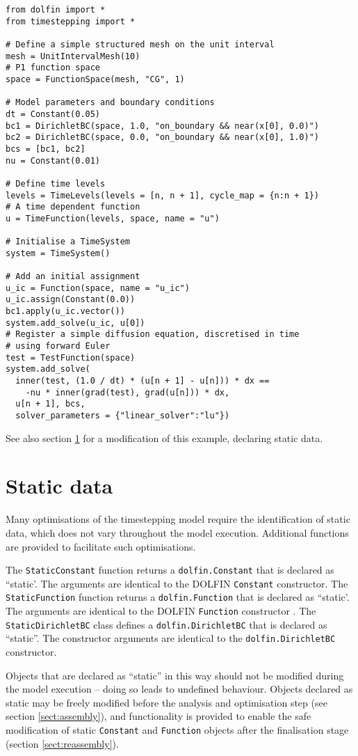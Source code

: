 \documentclass[a4paper]{book}
\begin{document}
\begin{lstlisting}
from dolfin import *
from timestepping import *

# Define a simple structured mesh on the unit interval
mesh = UnitIntervalMesh(10)
# P1 function space
space = FunctionSpace(mesh, "CG", 1)

# Model parameters and boundary conditions
dt = Constant(0.05)
bc1 = DirichletBC(space, 1.0, "on_boundary && near(x[0], 0.0)")
bc2 = DirichletBC(space, 0.0, "on_boundary && near(x[0], 1.0)")
bcs = [bc1, bc2]
nu = Constant(0.01)

# Define time levels
levels = TimeLevels(levels = [n, n + 1], cycle_map = {n:n + 1})
# A time dependent function
u = TimeFunction(levels, space, name = "u")

# Initialise a TimeSystem
system = TimeSystem()

# Add an initial assignment
u_ic = Function(space, name = "u_ic")
u_ic.assign(Constant(0.0))
bc1.apply(u_ic.vector())
system.add_solve(u_ic, u[0])
# Register a simple diffusion equation, discretised in time
# using forward Euler
test = TestFunction(space)
system.add_solve(
  inner(test, (1.0 / dt) * (u[n + 1] - u[n])) * dx ==
    -nu * inner(grad(test), grad(u[n])) * dx,
  u[n + 1], bcs,
  solver_parameters = {"linear_solver":"lu"})
\end{lstlisting}
See also section \ref{sect:statics} for a modification of this example,
declaring static data.

\section{Static data}\label{sect:statics}

Many optimisations of the timestepping model require the identification of
static data, which does not vary throughout the model execution. Additional
functions are provided to facilitate such optimisations.

The \verb+StaticConstant+ function returns a \verb+dolfin.Constant+ that is
declared as ``static'. The arguments are identical to the DOLFIN \verb+Constant+
constructor. The \verb+StaticFunction+ function returns a \verb+dolfin.Function+
that is declared as ``static'. The arguments are identical to the DOLFIN
\verb+Function+ constructor . The \verb+StaticDirichletBC+ class defines a
\verb+dolfin.DirichletBC+ that is declared as ``static''. The constructor
arguments are identical to the \verb+dolfin.DirichletBC+ constructor.

Objects that are declared as ``static'' in this way should not be modified
during the model execution -- doing so leads to undefined behaviour. Objects
declared as static may be freely modified before the analysis and optimisation
step (see section \ref{sect:assembly}), and functionality is provided to enable
the safe modification of static \verb+Constant+ and \verb+Function+ objects
after the finalisation stage (section \ref{sect:reassembly}).
\end{document}
